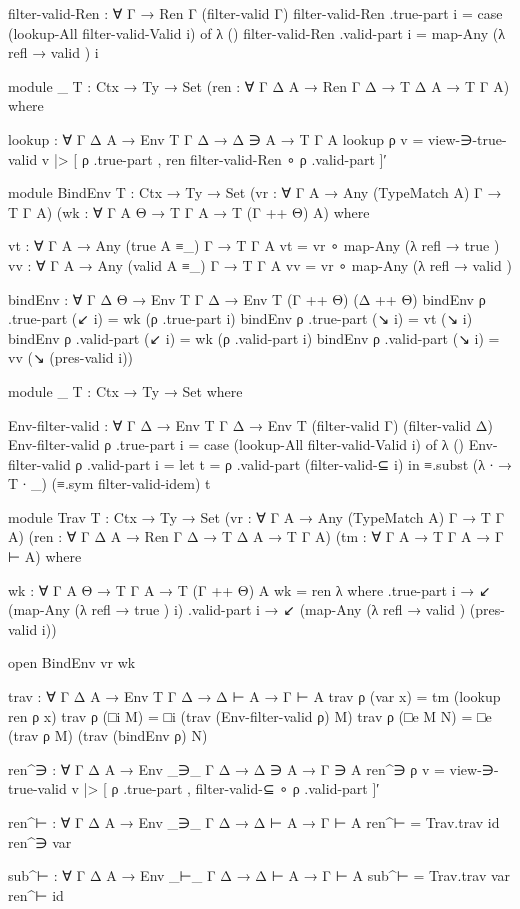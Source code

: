 \begin{code}
  filter-valid-Ren : ∀ {Γ} → Ren Γ (filter-valid Γ)
  filter-valid-Ren .true-part i = case (lookup-All filter-valid-Valid i) of λ ()
  filter-valid-Ren .valid-part i = map-Any (λ { refl → valid }) i

  module _ {T : Ctx → Ty → Set}
    (ren : ∀ {Γ Δ A} → Ren Γ Δ → T Δ A → T Γ A)
    where

    lookup : ∀ {Γ Δ A} → Env T Γ Δ → Δ ∋ A → T Γ A
    lookup ρ v = view-∋-true-valid v |>
      [ ρ .true-part , ren filter-valid-Ren ∘ ρ .valid-part ]′

  module BindEnv {T : Ctx → Ty → Set}
    (vr : ∀ {Γ A} → Any (TypeMatch A) Γ → T Γ A)
    (wk : ∀ {Γ A Θ} → T Γ A → T (Γ ++ Θ) A)
    where

    vt : ∀ {Γ A} → Any (true A ≡_) Γ → T Γ A
    vt = vr ∘ map-Any (λ { refl → true })
    vv : ∀ {Γ A} → Any (valid A ≡_) Γ → T Γ A
    vv = vr ∘ map-Any (λ { refl → valid })

    bindEnv : ∀ {Γ Δ Θ} → Env T Γ Δ → Env T (Γ ++ Θ) (Δ ++ Θ)
    bindEnv ρ .true-part (↙ i) = wk (ρ .true-part i)
    bindEnv ρ .true-part (↘ i) = vt (↘ i)
    bindEnv ρ .valid-part (↙ i) = wk (ρ .valid-part i)
    bindEnv ρ .valid-part (↘ i) = vv (↘ (pres-valid i))

  module _ {T : Ctx → Ty → Set} where

    Env-filter-valid : ∀ {Γ Δ} →
      Env T Γ Δ → Env T (filter-valid Γ) (filter-valid Δ)
    Env-filter-valid ρ .true-part i =
      case (lookup-All filter-valid-Valid i) of λ ()
    Env-filter-valid ρ .valid-part i =
      let t = ρ .valid-part (filter-valid-⊆ i) in
      ≡.subst (λ ∙ → T ∙ _) (≡.sym filter-valid-idem) t

  module Trav {T : Ctx → Ty → Set}
    (vr : ∀ {Γ A} → Any (TypeMatch A) Γ → T Γ A)
    (ren : ∀ {Γ Δ A} → Ren Γ Δ → T Δ A → T Γ A)
    (tm : ∀ {Γ A} → T Γ A → Γ ⊢ A)
    where

    wk : ∀ {Γ A Θ} → T Γ A → T (Γ ++ Θ) A
    wk = ren λ where
      .true-part i → ↙ (map-Any (λ { refl → true }) i)
      .valid-part i → ↙ (map-Any (λ { refl → valid }) (pres-valid i))

    open BindEnv vr wk

    trav : ∀ {Γ Δ A} → Env T Γ Δ → Δ ⊢ A → Γ ⊢ A
    trav ρ (var x) = tm (lookup ren ρ x)
    trav ρ (□i M) = □i (trav (Env-filter-valid ρ) M)
    trav ρ (□e M N) = □e (trav ρ M) (trav (bindEnv ρ) N)
\end{code}

\begin{code}
  ren^∋ : ∀ {Γ Δ A} → Env _∋_ Γ Δ → Δ ∋ A → Γ ∋ A
  ren^∋ ρ v = view-∋-true-valid v |>
    [ ρ .true-part , filter-valid-⊆ ∘ ρ .valid-part ]′

  ren^⊢ : ∀ {Γ Δ A} → Env _∋_ Γ Δ → Δ ⊢ A → Γ ⊢ A
  ren^⊢ = Trav.trav id ren^∋ var

  sub^⊢ : ∀ {Γ Δ A} → Env _⊢_ Γ Δ → Δ ⊢ A → Γ ⊢ A
  sub^⊢ = Trav.trav var ren^⊢ id
\end{code}
